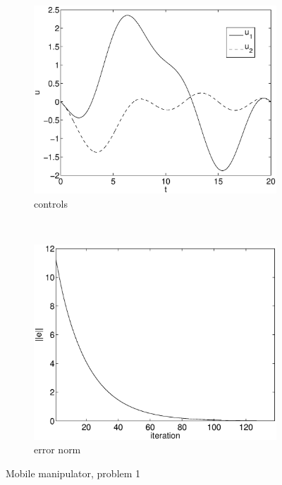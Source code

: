 \begin{figure}[h]
\begin{subfigure}[b]{0.45\textwidth}
\centering
\includegraphics[width=\textwidth]{img/manip_task_u.eps}
\caption{controls}
\end{subfigure}
~
\begin{subfigure}[b]{0.45\textwidth}
\centering
\includegraphics[width=\textwidth]{img/manip_task_err.eps}
\caption{error norm}
\end{subfigure}
\caption{Mobile manipulator, problem 1}
\label{fig:pr1}
\end{figure}

